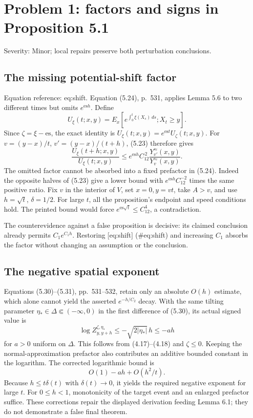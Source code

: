 \documentclass[10pt]{article}
\begin{document}
\section*{Problem 1: factors and signs in Proposition 5.1}
Severity: Minor; local repairs preserve both perturbation conclusions.\par
\subsection*{The missing potential-shift factor}
Equation reference: eq:shift. Equation (5.24), p. 531, applies Lemma 5.6 to two different times but omits \(e^{\mathrm{es}h}\). Define \[U_\xi(t;x,y)=E_x[e^{\int_0^t\xi(X_s)\,ds};X_t\ge y].\] Since \(\zeta=\xi-\mathrm{es}\), the exact identity is \(U_\xi(t;x,y)=e^{\mathrm{es}t}U_\zeta(t;x,y)\). For \(v=(y-x)/t\), \(v'=(y-x)/(t+h)\), (5.23) therefore gives \[
\frac{U_\xi(t+h;x,y)}{U_\xi(t;x,y)}
\le e^{\mathrm{es}h}C_{12}^{\,2}
       \frac{Y^\approx_{v'}(x,y)}{Y^\approx_v(x,y)} .\] The omitted factor cannot be absorbed into a fixed prefactor in (5.24). Indeed the opposite halves of (5.23) give a lower bound with \(e^{\mathrm{es}h}C_{12}^{-2}\) times the same positive ratio. Fix \(v\) in the interior of \(V\), set \(x=0,y=vt\), take \(A>v\), and use \(h=\sqrt t\), \(\delta=1/2\). For large \(t\), all the proposition’s endpoint and speed conditions hold. The printed bound would force \(e^{\mathrm{es}\sqrt t}\le C_{12}^{4}\), a contradiction.\par
The counterevidence against a false proposition is decisive: its claimed conclusion already permits \(C_1e^{C_1h}\). Restoring [eq:shift] (\#eq:shift) and increasing \(C_1\) absorbs the factor without changing an assumption or the conclusion.\par
\subsection*{The negative spatial exponent}
Equations (5.30)–(5.31), pp. 531–532, retain only an absolute \(O(h)\) estimate, which alone cannot yield the asserted \(e^{-h/C_2}\) decay. With the same tilting parameter \(\eta_* \in\Delta\Subset(-\infty,0)\) in the first difference of (5.30), its actual signed value is \[\log Z^{\zeta,\eta_*}_{y,y+h}
 \le-\sqrt{2|\eta_*|}\,h\le-a h\] for \(a>0\) uniform on \(\Delta\). This follows from (4.17)–(4.18) and \(\zeta\le0\). Keeping the normal-approximation prefactor also contributes an additive bounded constant in the logarithm. The corrected logarithmic bound is \[O(1)-a h+O(h^2/t).\] Because \(h\le t\delta(t)\) with \(\delta(t)\to0\), it yields the required negative exponent for large \(t\). For \(0\le h<1\), monotonicity of the target event and an enlarged prefactor suffice. These corrections repair the displayed derivation feeding Lemma 6.1; they do not demonstrate a false final theorem.\par
\end{document}
